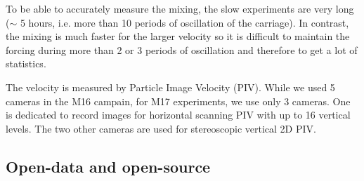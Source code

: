 To be able to accurately measure the mixing, the slow experiments are very long
($\sim$ 5 hours, i.e. more than 10 periods of oscillation of the carriage). In
contrast, the mixing is much faster for the larger velocity so it is difficult
to maintain the forcing during more than 2 or 3 periods of oscillation and
therefore to get a lot of statistics.

The velocity is measured by Particle Image Velocity (PIV). While we used 5
cameras in the M16 campain, for M17 experiments, we use only 3 cameras. One is
dedicated to record images for horizontal scanning PIV with up to 16 vertical
levels. The two other cameras are used for stereoscopic vertical 2D PIV.



\subsection{Open-data and open-source}



%
%
%
%
%


